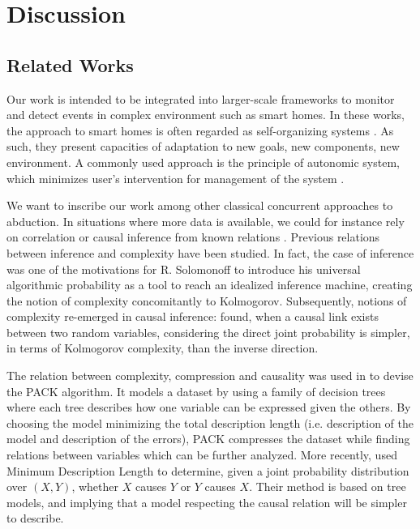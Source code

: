 \documentclass[entropy,article,submit,moreauthors,pdftex]{Definitions/mdpi}
\begin{document}




\section{Discussion}

\subsection{Related Works}
\label{sec:related}
Our work is intended to be integrated into larger-scale frameworks to monitor
and detect events in complex environment such as smart homes. In these works, the
approach to smart homes is often regarded as self-organizing systems \cite{kramer_rigorous_2009,kounev_notion_2017}. As such, they present capacities of adaptation to new goals,
new components, new environment. A commonly used approach is the principle of
autonomic system, which minimizes user's intervention for management of the
system \cite{kounev_notion_2017,kephart_vision_2003}.

We want to inscribe our work among other classical concurrent approaches to
abduction. In situations where more data is available, we could for instance rely
on correlation or causal inference from known relations \cite{peters_elements_2017,fadiga_or_2021}.
Previous relations between inference and complexity have been studied. In fact, the
case of inference was one of the motivations for R. Solomonoff to introduce his
universal algorithmic probability \cite{solomonoff_formal_1964} as a tool to
reach an idealized inference machine, creating the notion of complexity concomitantly
to Kolmogorov. Subsequently, notions of complexity re-emerged in causal inference:
\cite{janzing_causal_2010} found, when a causal link exists between two random variables,
considering the direct joint probability is simpler, in terms of Kolmogorov complexity,
than the inverse direction.

The relation between complexity, compression and causality was used in \cite{tatti_finding_2008} to devise the PACK algorithm. It models a dataset by using a family of decision trees where each tree describes how one variable can be expressed given the others. By choosing the model minimizing the total description length (i.e. description of the model and description of the errors), PACK compresses the dataset while finding relations between variables which can be further analyzed. More recently, \cite{marx_causal_2018} used Minimum Description Length to determine, given a joint probability distribution over $(X,Y)$, whether $X$ causes $Y$ or $Y$ causes $X$. Their method is based on tree models, and implying that a model respecting the causal relation will be simpler to describe.
\end{document}
